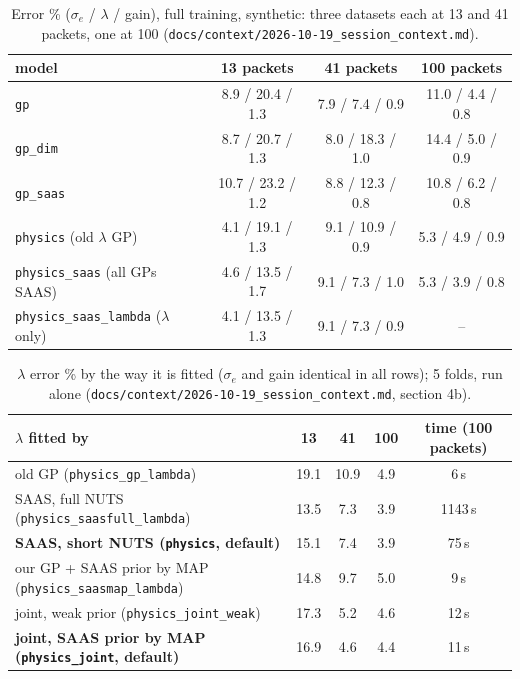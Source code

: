 \documentclass[10pt]{article}
\newcommand{\code}[1]{\texttt{#1}}
\begin{document}
\begin{table}[H]
\centering\small
\begin{tabular}{lccc}
\toprule
model & 13 packets & 41 packets & 100 packets \\
\midrule
\code{gp} & 8.9 / 20.4 / 1.3 & 7.9 / 7.4 / 0.9 & 11.0 / 4.4 / 0.8 \\
\code{gp\_dim} & 8.7 / 20.7 / 1.3 & 8.0 / 18.3 / 1.0 & 14.4 / 5.0 / 0.9 \\
\code{gp\_saas} & 10.7 / 23.2 / 1.2 & 8.8 / 12.3 / 0.8 & 10.8 / 6.2 / 0.8 \\
\code{physics} (old $\lambda$ GP) & 4.1 / 19.1 / 1.3 & 9.1 / 10.9 / 0.9 & 5.3 / 4.9 / 0.9 \\
\code{physics\_saas} (all GPs SAAS) & 4.6 / 13.5 / 1.7 & 9.1 / 7.3 / 1.0 & 5.3 / 3.9 / 0.8 \\
\code{physics\_saas\_lambda} ($\lambda$ only) & 4.1 / 13.5 / 1.3 & 9.1 / 7.3 / 0.9 & -- \\
\bottomrule
\end{tabular}
\caption{Error \% ($\sigma_e$ / $\lambda$ / gain), full training, synthetic: three datasets each at 13 and 41 packets, one at 100
(\code{docs/context/2026-10-19\_session\_context.md}).}
\end{table}

\begin{table}[H]
\centering\small
\begin{tabular}{lcccc}
\toprule
$\lambda$ fitted by & 13 & 41 & 100 & time (100 packets) \\
\midrule
old GP (\code{physics\_gp\_lambda}) & 19.1 & 10.9 & 4.9 & 6\,s \\
SAAS, full NUTS (\code{physics\_saasfull\_lambda}) & 13.5 & 7.3 & 3.9 & 1143\,s \\
\textbf{SAAS, short NUTS (\code{physics}, default)} & 15.1 & 7.4 & 3.9 & 75\,s \\
our GP + SAAS prior by MAP (\code{physics\_saasmap\_lambda}) & 14.8 & 9.7 & 5.0 & 9\,s \\
joint, weak prior (\code{physics\_joint\_weak}) & 17.3 & 5.2 & 4.6 & 12\,s \\
\textbf{joint, SAAS prior by MAP (\code{physics\_joint}, default)} & 16.9 & 4.6 & 4.4 & 11\,s \\
\bottomrule
\end{tabular}
\caption{$\lambda$ error \% by the way it is fitted ($\sigma_e$ and gain identical in all rows); 5 folds, run alone
(\code{docs/context/2026-10-19\_session\_context.md}, section 4b).}
\end{table}
\end{document}
